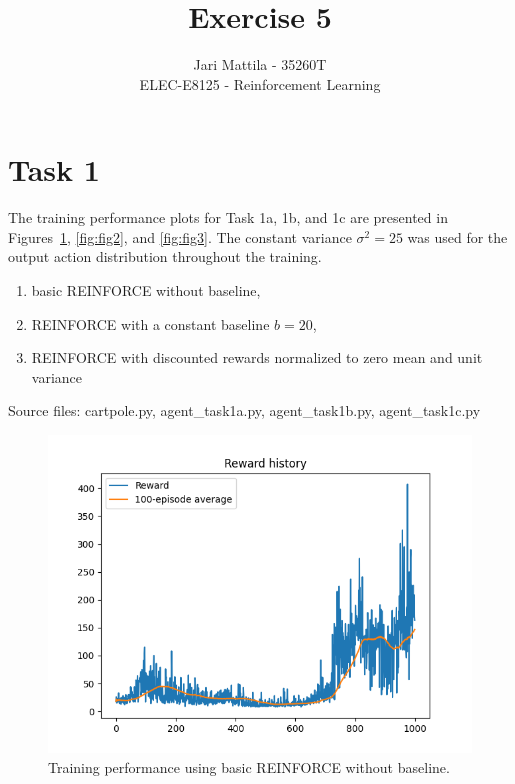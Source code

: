 \documentclass[12pt]{article}
\begin{document}
 
\title{Exercise 5}
\author{Jari Mattila - 35260T\\
ELEC-E8125 - Reinforcement Learning}

\maketitle

\section{Task 1}

The training performance plots for Task 1a, 1b, and 1c are presented in Figures~\ref*{fig:fig1}, \ref*{fig:fig2}, and \ref*{fig:fig3}. The constant variance $\sigma^2 = 25$ was used for the output action distribution throughout the training.

\begin{enumerate}[label=(\alph*)]
    \item basic REINFORCE without baseline, 
    \item REINFORCE with a constant baseline $b = 20$,
    \item REINFORCE with discounted rewards normalized to zero mean and unit variance
\end{enumerate}

\noindent
Source files: cartpole.py, agent\_task1a.py, agent\_task1b.py, agent\_task1c.py 


\begin{figure}[phb] 
	\centering  %
    \includegraphics[width=0.7\columnwidth]{img/Figure_1_task_1a_cumulative_reward.png}
	\caption{Training performance using basic REINFORCE without baseline.}
	\label{fig:fig1}
\end{figure}
\end{document}

